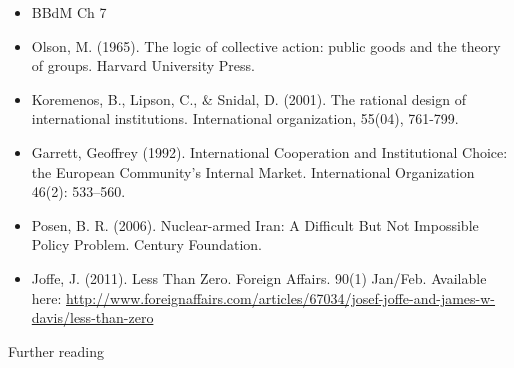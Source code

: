 \documentclass[12pt,a4paper]{article}
\begin{document}
\begin{itemize}
	\item BBdM Ch 7
	\item Olson, M. (1965). The logic of collective action: public goods and the theory of groups. Harvard University Press.
	\item Koremenos, B., Lipson, C., \& Snidal, D. (2001). The rational design of international institutions. International organization, 55(04), 761-799.
	\item Garrett, Geoffrey (1992). International Cooperation and Institutional Choice: the European Community’s Internal Market. International Organization 46(2): 533–560.
	\item Posen, B. R. (2006). Nuclear-armed Iran: A Difficult But Not Impossible Policy Problem. Century Foundation.
	\item Joffe, J. (2011). Less Than Zero. Foreign Affairs. 90(1) Jan/Feb. Available here: \url{http://www.foreignaffairs.com/articles/67034/josef-joffe-and-james-w-davis/less-than-zero}
\end{itemize}

\noindent Further reading
\end{document}
